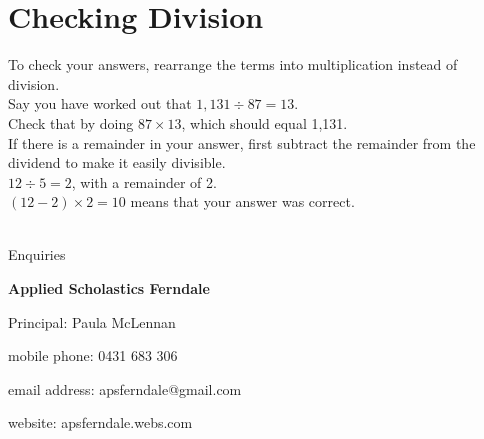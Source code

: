 \documentclass{article}
\begin{document}
\pagebreak

\section{Checking Division}

To check your answers, rearrange the terms into multiplication instead of division.\\

Say you have worked out that $1,131 \div 87 = 13$.\\

Check that by doing $87 \times 13$, which should equal 1,131.\\

If there is a  remainder in your answer, first subtract the remainder from the dividend to make it easily divisible.\\

$12 \div 5 = 2$, with a remainder of 2.\\

$(12 - 2) \times 2 = 10$ means that your answer was correct.\\

\newpage
\

\begin{center}
\linespread{2}\large

Enquiries

\textbf{Applied Scholastics Ferndale}

Principal: Paula McLennan

mobile phone: 0431 683 306

email address: apsferndale@gmail.com

website: apsferndale.webs.com
\end{center}
\end{document}
